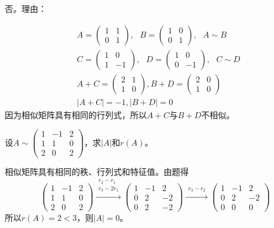 \documentclass[a4paper]{report}
\begin{document}
\begin{jie}
否。理由：

\begin{align*}
&A=
\begin{pmatrix}
1&1\\ 0&1
\end{pmatrix},~~~B=
\begin{pmatrix}
1&0\\ 0&1
\end{pmatrix},~~~A\sim B\\
&C=
\begin{pmatrix}
1&0\\ 1&-1
\end{pmatrix},~~~D=
\begin{pmatrix}
1&0\\ 0&-1
\end{pmatrix},~~~C\sim D\\
& A+C=
\begin{pmatrix}
2&1\\ 1&0
\end{pmatrix},B+D=
\begin{pmatrix}
2&0\\
1&0
\end{pmatrix}\\
&|A+C|=-1,|B+D|=0
\end{align*}
因为相似矩阵具有相同的行列式，所以$A+C$与$B+D$不相似。
\end{jie}

\EX 设$A\sim
\begin{pmatrix}
1&-1&2\\
1&1&0\\
2&0&2
\end{pmatrix}
$，求$|A|$和$r(A)$。

\begin{jie}
相似矩阵具有相同的秩、行列式和特征值。由题得
\begin{equation*}
\begin{pmatrix}
1&-1&2\\
1&1&0\\
2&0&2
\end{pmatrix}\xrightarrow{\substack{r_{2}-r_{1}\\ r_3-2r_1}}
{
\begin{pmatrix}
1&-1&2\\
0&2&-2\\
0&2&-2
\end{pmatrix}
}\xrightarrow{\substack{ r_3-r_2}}
{
\begin{pmatrix}
1&-1&2\\
0&2&-2\\
0&0&0
\end{pmatrix}
}
\end{equation*}
所以$r(A)=2<3$，则$|A|=0$。
\end{jie}
\end{document}
